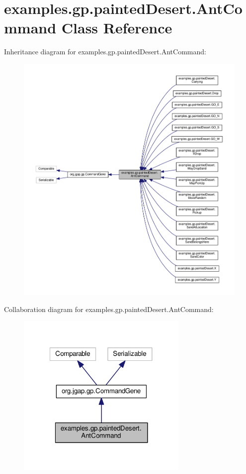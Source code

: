 \hypertarget{classexamples_1_1gp_1_1painted_desert_1_1_ant_command}{\section{examples.\-gp.\-painted\-Desert.\-Ant\-Command Class Reference}
\label{classexamples_1_1gp_1_1painted_desert_1_1_ant_command}
}


Inheritance diagram for examples.\-gp.\-painted\-Desert.\-Ant\-Command\-:
\nopagebreak
\begin{figure}[H]
\begin{center}
\leavevmode
\includegraphics[width=350pt]{classexamples_1_1gp_1_1painted_desert_1_1_ant_command__inherit__graph}
\end{center}
\end{figure}


Collaboration diagram for examples.\-gp.\-painted\-Desert.\-Ant\-Command\-:
\nopagebreak
\begin{figure}[H]
\begin{center}
\leavevmode
\includegraphics[width=233pt]{classexamples_1_1gp_1_1painted_desert_1_1_ant_command__coll__graph}
\end{center}
\end{figure}
